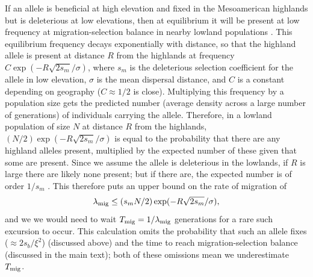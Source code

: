 
If an allele is beneficial at high elevation and fixed in the Mesoamerican highlands but is deleterious at low elevations, 
then at equilibrium it will be present at low frequency at migration-selection balance in nearby lowland populations \citep{haldane1948theory,slatkin1973geneflow}.
This equilibrium frequency decays exponentially with distance, so that the highland allele is present at distance $R$ from the highlands at frequency $C \exp(- R \sqrt{2s_m} / \sigma)$, where $s_m$ is the deleterious selection coefficient for the allele in low elevation, $\sigma$ is the mean dispersal distance, and $C$ is a constant depending on geography ($C\approx 1/2$ is close).
Multiplying this frequency by a population size gets the predicted number (average density across a large number of generations) of individuals carrying the allele.
Therefore, in a lowland population of size $N$ at distance $R$ from the highlands, $(N/2)  \exp(- R \sqrt{2s_m} / \sigma)$ 
is equal to the probability that there are any highland alleles present, multiplied by the expected number of these given that some are present.
Since we assume the allele is deleterious in the lowlands, if $R$ is large there are likely none present;
but if there are, the expected number is of order $1/s_m$ \citep{geiger1999elementary,ralph2014convergent}.
This therefore puts an upper bound on the rate of migration of
\begin{align} \label{eqn:migrate}
  \lambda_{\text{mig}} \le (s_m N/2)  \exp(- R \sqrt{2s_m} / \sigma),
\end{align}
and we we would need to wait $T_{\text{mig}} = 1/\lambda_{\text{mig}}$ generations for a rare such excursion to occur.
This calculation omits the probability that such an allele fixes ($\approx 2s_b/\xi^2$)
(discussed above)
and the time to reach migration-selection balance
(discussed in the main text);
both of these omissions mean we underestimate $T_{\text{mig}}$.


